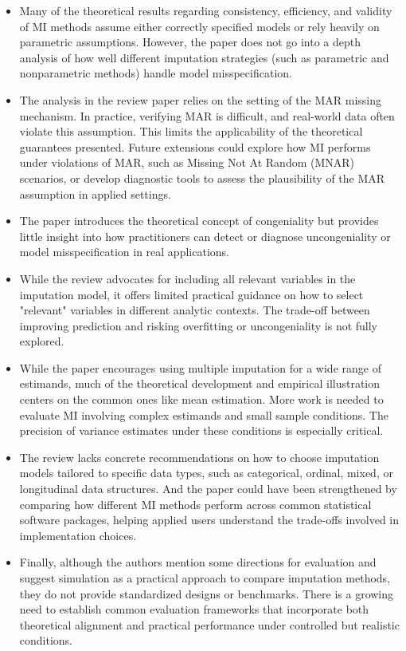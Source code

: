 \documentclass[12pt,oneside]{amsart}
\theoremstyle{definition}
\theoremstyle{remark}
\numberwithin{equation}{section}
\begin{document}
\begin{itemize}
    \item Many of the theoretical results regarding consistency, efficiency, and validity of MI methods assume either correctly specified models or rely heavily on parametric assumptions. However, the paper does not go into a depth analysis of how well different imputation strategies (such as parametric and nonparametric methods) handle model misspecification. 
    \item The analysis in the review paper relies on the setting of the MAR missing mechanism. In practice, verifying MAR is difficult, and real-world data often violate this assumption. This limits the applicability of the theoretical guarantees presented. Future extensions could explore how MI performs under violations of MAR, such as Missing Not At Random (MNAR) scenarios, or develop diagnostic tools to assess the plausibility of the MAR assumption in applied settings.
    \item The paper introduces the theoretical concept of congeniality but provides little insight into how practitioners can detect or diagnose uncongeniality or model misspecification in real applications.
    \item While the review advocates for including all relevant variables in the imputation model, it offers limited practical guidance on how to select "relevant" variables in different analytic contexts. The trade-off between improving prediction and risking overfitting or uncongeniality is not fully explored.
    \item While the paper encourages using multiple imputation for a wide range of estimands, much of the theoretical development and empirical illustration centers on the common ones like mean estimation. More work is needed to evaluate MI involving complex estimands and small sample conditions. The precision of variance estimates under these conditions is especially critical.
    \item The review lacks concrete recommendations on how to choose imputation models tailored to specific data types, such as categorical, ordinal, mixed, or longitudinal data structures. And the paper could have been strengthened by comparing how different MI methods perform across common statistical software packages, helping applied users understand the trade-offs involved in implementation choices.
    \item Finally, although the authors mention some directions for evaluation and suggest simulation as a practical approach to compare imputation methods, they do not provide standardized designs or benchmarks. There is a growing need to establish common evaluation frameworks that incorporate both theoretical alignment and practical performance under controlled but realistic conditions.
\end{itemize}
\end{document}
